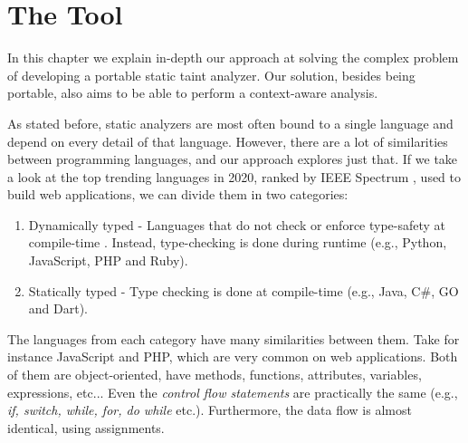 
\chapter{The \toolname{} Tool}


\label{solution}
In this chapter we explain in-depth our approach at solving the complex problem of developing a portable static taint analyzer. Our solution, besides being portable, also aims to be able to perform a context-aware analysis.

As stated before, static analyzers are most often bound to a single language and depend on every detail of that language. However, there are a lot of similarities between programming languages, and our approach explores just that. If we take a look at the top trending languages in 2020, ranked by IEEE Spectrum \cite{cass2020top}, used to build web applications, we can divide them in two categories:

\begin{enumerate}
    \item Dynamically typed - Languages that do not check or enforce type-safety at compile-time \cite{tratt2009dynamically}. Instead, type-checking is done during runtime (e.g., Python, JavaScript, PHP and Ruby).
    \item Statically typed - Type checking is done at compile-time (e.g., Java, C\#, GO and Dart).
\end{enumerate}


The languages from each category have many similarities between them. Take for instance JavaScript and PHP, which are very common on web applications. Both of them are object-oriented, have methods, functions, attributes, variables, expressions, etc... Even the \textit{control flow statements} are practically the same (e.g., \textit{if, switch, while, for, do while} etc.). Furthermore, the data flow is almost identical, using assignments. 

